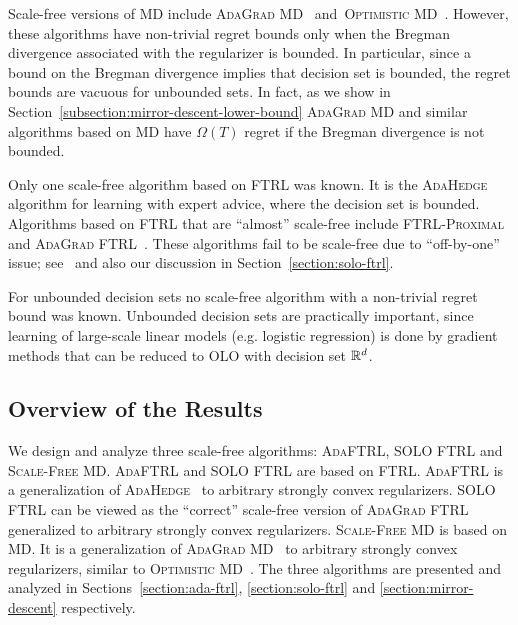 Scale-free versions of \textsc{MD} include \textsc{AdaGrad
MD}~\cite{Duchi-Hazan-Singer-2011} and~\textsc{Optimistic
MD}~\cite{Rakhlin-Sridharan-2013}. However, these algorithms have non-trivial
regret bounds only when the Bregman divergence associated with the regularizer
is bounded. In particular, since a bound on the Bregman divergence implies that
decision set is bounded, the regret bounds are vacuous for unbounded sets.  In
fact, as we show in Section~\ref{subsection:mirror-descent-lower-bound}
\textsc{AdaGrad MD} and similar algorithms based on \textsc{MD} have
$\Omega(T)$ regret if the Bregman divergence is not bounded.

Only one scale-free algorithm based on \textsc{FTRL} was known. It is the
\textsc{AdaHedge}~\cite{de-Rooij-van-Erven-Grunwald-Koolen-2014} algorithm for
learning with expert advice, where the decision set is bounded.
Algorithms based on \textsc{FTRL} that are ``almost'' scale-free include
\textsc{FTRL-Proximal}~\cite{McMahan-Streeter-2010,McMahan-2014} and
\textsc{AdaGrad FTRL}~\cite{Duchi-Hazan-Singer-2011}.  These algorithms fail to
be scale-free due to ``off-by-one'' issue; see~\cite{McMahan-2014} and also our
discussion in Section~\ref{section:solo-ftrl}.

For unbounded decision sets no scale-free algorithm with a non-trivial regret
bound was known. Unbounded decision sets are practically important, since
learning of large-scale linear models (e.g. logistic regression) is done by
gradient methods that can be reduced to OLO with decision set $\mathbb{R}^d$.

\subsection{Overview of the Results}

We design and analyze three scale-free algorithms: \textsc{AdaFTRL},
\textsc{SOLO FTRL} and \textsc{Scale-Free MD}.  \textsc{AdaFTRL} and
\textsc{SOLO FTRL} are based on \textsc{FTRL}.  \textsc{AdaFTRL} is a
generalization of
\textsc{AdaHedge}~\cite{de-Rooij-van-Erven-Grunwald-Koolen-2014} to arbitrary
strongly convex regularizers.  \textsc{SOLO FTRL} can be viewed as the
``correct'' scale-free version of \textsc{AdaGrad
FTRL}~\cite{Duchi-Hazan-Singer-2011} generalized to arbitrary strongly convex
regularizers.  \textsc{Scale-Free MD} is based on \textsc{MD}. It is a
generalization of \textsc{AdaGrad MD}~\cite{Duchi-Hazan-Singer-2011} to
arbitrary strongly convex regularizers, similar to \textsc{Optimistic
MD}~\cite{Rakhlin-Sridharan-2013}.  The three algorithms are presented and
analyzed in Sections~\ref{section:ada-ftrl}, \ref{section:solo-ftrl} and
\ref{section:mirror-descent} respectively.


